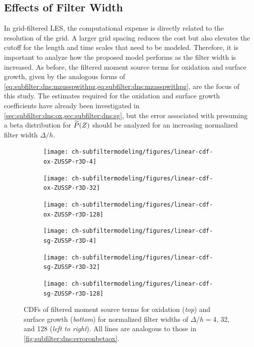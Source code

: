 \subsection{Effects of Filter Width}
\label{sec:subfilter:dns:fw}

In grid-filtered LES, the computational expense is directly related to the resolution of the grid. A larger grid spacing reduces the cost but also elevates the cutoff for the length and time scales that need to be modeled. Therefore, it is important to analyze how the proposed model performs as the filter width is increased. As before, the filtered moment source terms for oxidation and surface growth, given by the analogous forms of \cref{eq:subfilter:dns:mzusspwithpz,eq:subfilter:dns:mzasspwithpz}, are the focus of this study. The estimates required for the oxidation and surface growth coefficients have already been investigated in \cref{sec:subfilter:dns:ox,sec:subfilter:dns:sg}, but the error associated with presuming a beta distribution for $\widetilde{P}(Z)$ should be analyzed for an increasing normalized filter width $\Delta/h$. 

\begin{figure}[ht]
  \centering
  \begin{subfigure}[b]{0.33\linewidth}
    \centering
    \texttt{[image: ch-subfiltermodeling/figures/linear-cdf-ox-ZUSSP-r3D-4]}
  \end{subfigure}%
  \begin{subfigure}[b]{0.33\linewidth}
    \centering
    \texttt{[image: ch-subfiltermodeling/figures/linear-cdf-ox-ZUSSP-r3D-32]}
  \end{subfigure}%
  \begin{subfigure}[b]{0.33\linewidth}
    \centering
    \texttt{[image: ch-subfiltermodeling/figures/linear-cdf-ox-ZUSSP-r3D-128]}
  \end{subfigure}
  \begin{subfigure}[b]{0.33\linewidth}
    \centering
    \texttt{[image: ch-subfiltermodeling/figures/linear-cdf-sg-ZUSSP-r3D-4]}
  \end{subfigure}%
  \begin{subfigure}[b]{0.33\linewidth}
    \centering
    \texttt{[image: ch-subfiltermodeling/figures/linear-cdf-sg-ZUSSP-r3D-32]}
  \end{subfigure}%
  \begin{subfigure}[b]{0.33\linewidth}
    \centering
    \texttt{[image: ch-subfiltermodeling/figures/linear-cdf-sg-ZUSSP-r3D-128]}
  \end{subfigure}
  \caption[Error Associated with $\pz = \beta(Z;\tf{Z},\tf{Z_V})$ for Various $\Delta/h$]{CDFs of filtered moment source terms for oxidation (\textit{top}) and surface growth (\textit{bottom}) for normalized filter widths of $\Delta/h = 4$, 32, and 128 (\textit{left to right}). All lines are analogous to those in \cref{fig:subfilter:dns:erroronbetaox}.}
  \label{fig:subfilter:dns:erroronbetafwidth}
\end{figure}

